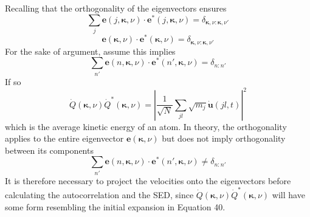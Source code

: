 \documentclass[aps,prb,preprint,preprintnumbers,amsmath,amssymb,floatfix,superscriptaddress]{revtex4}
\begin{document}
Recalling that the orthogonality of the eigenvectors ensures 
\begin{equation}
\sum_{j}\pmb{e}(j,\pmb{\kappa},\nu)\cdot\pmb{e}^*(j,\pmb{\kappa},\nu)= \delta_{\pmb{\kappa},\nu:\pmb{\kappa},\nu'}
\end{equation}
\begin{equation}
\pmb{e}(\pmb{\kappa},\nu)\cdot\pmb{e}^*(\pmb{\kappa},\nu)= \delta_{\pmb{\kappa},\nu:\pmb{\kappa},\nu'}
\end{equation}
For the sake of argument, assume this implies
\begin{equation}
\sum_{n'}\pmb{e}(n,\pmb{\kappa},\nu)\cdot\pmb{e}^*(n',\pmb{\kappa},\nu)=\delta_{n:n'}
\end{equation}
If so
\begin{equation}
\dot{Q}(\pmb{\kappa},\nu)\dot{Q}^*(\pmb{\kappa},\nu)=|\frac{1}{\sqrt{N}}\sum_{jl}\sqrt{m_j}\dot{\pmb{u}}(jl,t)|^2
\end{equation}
which is the average kinetic energy of an atom. In theory, the orthogonality applies to the entire eigenvector $\pmb{e}(\pmb{\kappa},\nu)$ but does not imply orthogonality between its components
\begin{equation}
\sum_{n'}\pmb{e}(n,\pmb{\kappa},\nu)\cdot\pmb{e}^*(n',\pmb{\kappa},\nu)\neq\delta_{n:n'}
\end{equation}
It is therefore necessary to project the velocities onto the eigenvectors before calculating the autocorrelation and the SED, since $\dot{Q}(\pmb{\kappa},\nu)\dot{Q}^*(\pmb{\kappa},\nu)$ will have some form resembling the initial expansion in Equation 40.
\end{document}
